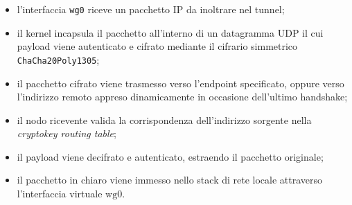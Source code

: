 \begin{itemize}
\tightlist
\item
  l'interfaccia \passthrough{\lstinline!wg0!} riceve un pacchetto IP da
  inoltrare nel tunnel;
\item
  il kernel incapsula il pacchetto all'interno di un datagramma UDP il
  cui payload viene autenticato e cifrato mediante il cifrario
  simmetrico \passthrough{\lstinline!ChaCha20Poly1305!};
\item
  il pacchetto cifrato viene trasmesso verso l'endpoint specificato,
  oppure verso l'indirizzo remoto appreso dinamicamente in occasione
  dell'ultimo handshake;
\item
  il nodo ricevente valida la corrispondenza dell'indirizzo sorgente
  nella \emph{cryptokey routing table};
\item
  il payload viene decifrato e autenticato, estraendo il pacchetto
  originale;
\item
  il pacchetto in chiaro viene immesso nello stack di rete locale
  attraverso l'interfaccia virtuale \(\text{wg}0\).
\end{itemize}
